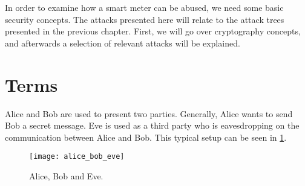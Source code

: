 
In order to examine how a smart meter can be abused, we need some basic security concepts.
The attacks presented here will relate to the attack trees presented in the previous chapter.
First, we will go over cryptography concepts, and afterwards a selection of relevant attacks will be explained.

\section{Terms}
Alice and Bob are used to present two parties.
Generally, Alice wants to send Bob a secret message.
Eve is used as a third party who is eavesdropping on the communication between Alice and Bob.
This typical setup can be seen in \cref{alice_bob_eve}.

\begin{figure}[H]
  \begin{center}
    \texttt{[image: alice\_bob\_eve]}
  \end{center}
  \caption[wat]{Alice, Bob and Eve.\footnotemark}
  \label{alice_bob_eve}
\end{figure}
